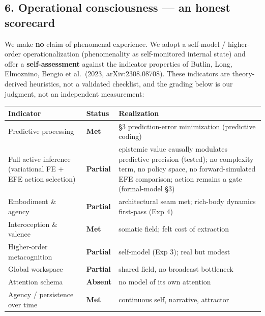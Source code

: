 \documentclass[
]{article}
\newcounter{none} %
\begin{document}
\subsection{6. Operational consciousness --- an honest
scorecard}\label{operational-consciousness-an-honest-scorecard}

We make \textbf{no} claim of phenomenal experience. We adopt a
self-model / higher-order operationalization (phenomenality as
self-monitored internal state) and offer a \textbf{self-assessment}
against the indicator properties of Butlin, Long, Elmoznino, Bengio et
al.~(2023, arXiv:2308.08708). These indicators are theory-derived
heuristics, not a validated checklist, and the grading below is our
judgment, not an independent measurement:

{\def\LTcaptype{none} %
\begin{longtable}[]{@{}
  >{\raggedright\arraybackslash}p{}
  >{\raggedright\arraybackslash}p{}
  >{\raggedright\arraybackslash}p{}@{}}
\toprule\noalign{}
\begin{minipage}[b]{\linewidth}\raggedright
Indicator
\end{minipage} & \begin{minipage}[b]{\linewidth}\raggedright
Status
\end{minipage} & \begin{minipage}[b]{\linewidth}\raggedright
Realization
\end{minipage} \\
\midrule\noalign{}
\endhead
\bottomrule\noalign{}
\endlastfoot
Predictive processing & \textbf{Met} & §3 prediction-error minimization
(predictive coding) \\
Full active inference (variational FE + EFE action selection) &
\textbf{Partial} & epistemic value causally modulates predictive
precision (tested); no complexity term, no policy space, no
forward-simulated EFE comparison; action remains a gate (formal-model
§3) \\
Embodiment \& agency & \textbf{Partial} & architectural seam met;
rich-body dynamics first-pass (Exp 4) \\
Interoception \& valence & \textbf{Met} & somatic field; felt cost of
extraction \\
Higher-order metacognition & \textbf{Partial} & self-model (Exp 3); real
but modest \\
Global workspace & \textbf{Partial} & shared field, no broadcast
bottleneck \\
Attention schema & \textbf{Absent} & no model of its own attention \\
Agency / persistence over time & \textbf{Met} & continuous self,
narrative, attractor \\
\end{longtable}
}
\end{document}
